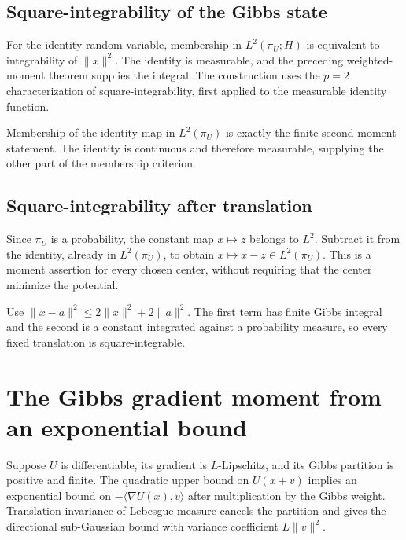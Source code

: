 \documentclass[11pt,a4paper]{article}
\begin{document}
\subsection{\texorpdfstring{Square-integrability of the Gibbs state}{Square-integrability of the Gibbs state}}


For the identity random variable, membership in \(L^2(\pi_U;H)\) is equivalent to integrability of \(\|x\|^2\). The identity is measurable, and the preceding weighted-moment theorem supplies the integral. The construction uses the \(p=2\) characterization of square-integrability, first applied to the measurable identity function.



Membership of the identity map in \(L^2(\pi_U)\) is exactly the finite second-moment statement. The identity is continuous and therefore measurable, supplying the other part of the membership criterion.


\subsection{\texorpdfstring{Square-integrability after translation}{Square-integrability after translation}}


Since \(\pi_U\) is a probability, the constant map \(x\mapsto z\) belongs to \(L^2\). Subtract it from the identity, already in \(L^2(\pi_U)\), to obtain \(x\mapsto x-z\in L^2(\pi_U)\). This is a moment assertion for every chosen center, without requiring that the center minimize the potential.



Use \(\|x-a\|^2\le2\|x\|^2+2\|a\|^2\). The first term has finite Gibbs integral and the second is a constant integrated against a probability measure, so every fixed translation is square-integrable.


\section{\texorpdfstring{The Gibbs gradient moment from an exponential bound}{The Gibbs gradient moment from an exponential bound}}


Suppose \(U\) is differentiable, its gradient is \(L\)-Lipschitz, and its Gibbs partition is positive and finite. The quadratic upper bound on \(U(x+v)\) implies an exponential bound on \(-\langle\nabla U(x),v\rangle\) after multiplication by the Gibbs weight. Translation invariance of Lebesgue measure cancels the partition and gives the directional sub-Gaussian bound with variance coefficient \(L\|v\|^2\).
\end{document}
